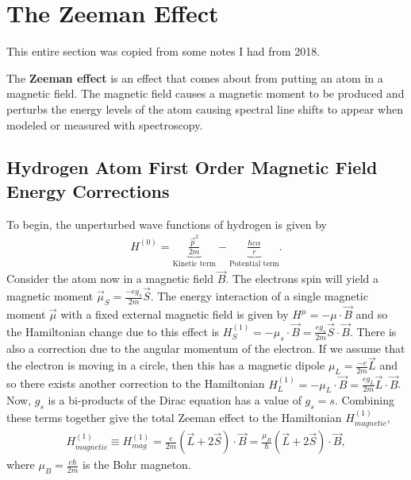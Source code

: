 \section{The Zeeman Effect}

\begin{note}
	This entire section was copied from some notes I had from 2018.
\end{note}

The \textbf{Zeeman effect} is an effect that comes about from putting an atom in a magnetic field. The magnetic field causes a magnetic moment to be produced and perturbs the energy levels of the atom causing spectral line shifts to appear when modeled or measured with spectroscopy. 




\subsection{Hydrogen Atom First Order Magnetic Field Energy Corrections}

To begin, the unperturbed wave functions of hydrogen is given by 
\begin{align}
	H^{(0)} = \underbrace{\frac{\vec{p}^2}{2m}}_{\textrm{Kinetic term}}-\underbrace{\frac{\hbar c \alpha}{r}}_{\textrm{Potential term}}.
\end{align}
Consider the atom now in a magnetic field $\vec{B}$. The electrons spin will yield a magnetic moment $\vec{\mu}_S=\frac{-eg_s}{2m}\vec{S}$. The energy interaction of a single magnetic moment $\vec{\mu}$ with a fixed external magnetic field is given by $H^{\mu}= - \mu \cdot \vec{B}$ and so the Hamiltonian change due to this effect is $H_{S}^{(1)} =  -\mu_s \cdot \vec{B} = \frac{eg_s}{2m}\vec{S}\cdot \vec{B}$. There is also a correction due to the angular momentum of the electron. If we assume that the electron is moving in a circle, then this has a magnetic dipole $\mu_L = \frac{-e}{2m}\vec{L}$ and so there exists another correction to the Hamiltonian $H_L^{(1)} = -\mu_L \cdot\vec{B} = \frac{eg_L}{2m}\vec{L}\cdot \vec{B}$. Now, $g_s$ is a bi-products of the Dirac equation has a value of $g_s=s$. Combining these terms together give the total Zeeman effect to the Hamiltonian $H_{magnetic}^{(1)}$,
\begin{align}
	H_{magnetic}^{(1)} \equiv H_{mag}^{(1)}= \frac{e}{2m}(\vec{L}+2\vec{S})\cdot \vec{B} = \frac{\mu_B}{\hbar}(\vec{L}+2\vec{S})\cdot \vec{B},
\end{align} 
where $\mu_B=\frac{e\hbar}{2m}$ is the Bohr magneton.

